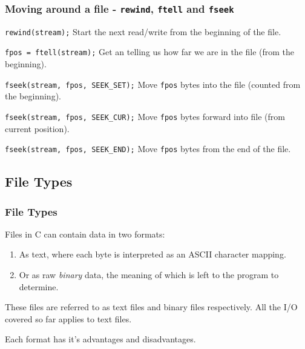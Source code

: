 \documentclass[smaller,handout,table]{beamer}
\begin{document}
\begin{frame}
\frametitle{Moving around a file - {\tt rewind}, {\tt ftell} and {\tt fseek}}
\begin{block}{\tt rewind(stream);}
Start the next read/write from the beginning of the file.
\end{block}

\begin{block}{\tt fpos = ftell(stream);}
Get an  telling us how far we are in the file (from the beginning).
\end{block}

\begin{block}{\tt fseek(stream, fpos, SEEK\_SET);}
Move {\tt fpos} bytes into the file (counted from the beginning).
\end{block}

\begin{block}{\tt fseek(stream, fpos, SEEK\_CUR);}
Move {\tt fpos} bytes forward into file (from current position).
\end{block}

\begin{block}{\tt fseek(stream, fpos, SEEK\_END);}
Move {\tt fpos} bytes from the end of the file.
\end{block}
\end{frame}

\subsection{File Types}
\begin{frame}
\frametitle{File Types}
Files in C can contain data in two formats:
\begin{enumerate}
\item As text, where each byte is interpreted as an ASCII character mapping.
\item Or as raw \emph{binary} data, the meaning of which is left to the program to determine.
\end{enumerate}

These files are referred to as text files and binary files respectively. All the I/O covered so far applies to text files.

\begin{block}{}
\begin{center}
Each format has it's advantages and disadvantages.
\end{center}
\end{block}
\end{frame}
\end{document}
